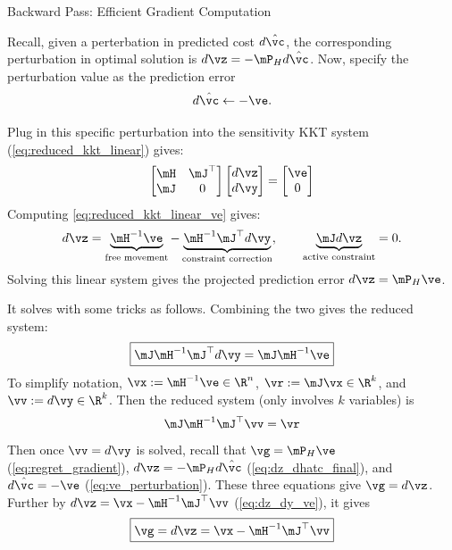 \documentclass[10pt,aspectratio=169,xcolor=dvipsnames]{beamer}
\begin{document}
\begin{frame}[allowframebreaks]{Backward Pass: Efficient Gradient Computation}

    Recall, given a perterbation in predicted cost $d\hat{\vc}$, the corresponding perturbation in optimal solution is $d\vz = -\mP_H d\hat{\vc}$. Now, specify the perturbation value as the prediction error
    \begin{equation}\label{eq:ve_perturbation}
        d\hat{\vc} \leftarrow - \ve .
    \end{equation}

    Plug in this specific perturbation into the sensitivity KKT system (\eqref{eq:reduced_kkt_linear}) gives:
    \begin{equation}\label{eq:reduced_kkt_linear_ve}
        \begin{bmatrix}
            \mH & \mJ^\top\\
            \mJ & 0
        \end{bmatrix}
        \begin{bmatrix}
            d\vz\\
            d\vy
        \end{bmatrix}
        =
        \begin{bmatrix}
            \ve\\
            0
        \end{bmatrix}
    \end{equation}
    Computing \eqref{eq:reduced_kkt_linear_ve} gives:
    \begin{equation}\label{eq:dz_dy_ve}
        d\vz =\underbrace{\mH^{-1} \ve}_{\text{free movement}} - \underbrace{\mH^{-1} \mJ^\top d\vy}_{\text{constraint correction}}, \qquad \underbrace{\mJ d\vz}_{\text{active constraint}} = 0 .
    \end{equation}
    Solving this linear system gives the projected prediction error $d\vz = \mP_H \ve$.

    \break

    It solves with some tricks as follows. Combining the two gives the reduced system:
    \begin{equation}
        \boxed{
            \mJ \mH^{-1} \mJ^\top d\vy = \mJ \mH^{-1} \ve
        }
    \end{equation}
    To simplify notation, $\vx:= \mH^{-1} \ve \in \R^n$, $\vr := \mJ \vx \in \R^k$, and $\vv := d\vy \in \R^k$. Then the reduced system (only involves $k$ variables) is
    \begin{equation}
            \mJ \mH^{-1} \mJ^\top \vv = \vr
    \end{equation}
    Then once $\vv = d\vy$ is solved, recall that $\vg = \mP_H \ve$ (\eqref{eq:regret_gradient}), $d\vz = - \mP_H d\hat{\vc}$ (\eqref{eq:dz_dhatc_final}), and $d\hat{\vc} = -\ve$ (\eqref{eq:ve_perturbation}). These three equations give $\vg = d\vz$. Further by $d\vz = \vx - \mH^{-1} \mJ^\top \vv$ (\eqref{eq:dz_dy_ve}), it gives
    \begin{equation}
        \boxed{
            \vg = d\vz = \vx - \mH^{-1} \mJ^\top \vv
        }
    \end{equation}


\end{frame}
\end{document}
